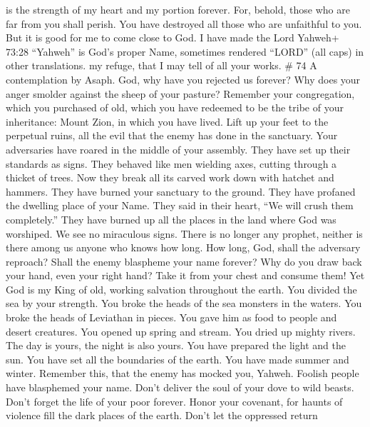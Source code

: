 is the strength of my heart and my portion forever.  For,
behold, those who are far from you shall perish. You have destroyed all
those who are unfaithful to you.  But it is good for me to
come close to God. I have made the Lord Yahweh+ 73:28 ``Yahweh'' is
God's proper Name, sometimes rendered ``LORD'' (all caps) in other
translations. my refuge, that I may tell of all your works. \# 74 A
contemplation by Asaph.  God, why have you rejected us
forever? Why does your anger smolder against the sheep of your pasture?
 Remember your congregation, which you purchased of old,
which you have redeemed to be the tribe of your inheritance: Mount Zion,
in which you have lived.  Lift up your feet to the perpetual
ruins, all the evil that the enemy has done in the sanctuary.
 Your adversaries have roared in the middle of your
assembly. They have set up their standards as signs.  They
behaved like men wielding axes, cutting through a thicket of trees.
 Now they break all its carved work down with hatchet and
hammers.  They have burned your sanctuary to the ground.
They have profaned the dwelling place of your Name.  They
said in their heart, ``We will crush them completely.'' They have burned
up all the places in the land where God was worshiped.  We
see no miraculous signs. There is no longer any prophet, neither is
there among us anyone who knows how long.  How long, God,
shall the adversary reproach? Shall the enemy blaspheme your name
forever?  Why do you draw back your hand, even your right
hand? Take it from your chest and consume them!  Yet God is
my King of old, working salvation throughout the earth. 
You divided the sea by your strength. You broke the heads of the sea
monsters in the waters.  You broke the heads of Leviathan
in pieces. You gave him as food to people and desert creatures.
 You opened up spring and stream. You dried up mighty
rivers.  The day is yours, the night is also yours. You
have prepared the light and the sun.  You have set all the
boundaries of the earth. You have made summer and winter. 
Remember this, that the enemy has mocked you, Yahweh. Foolish people
have blasphemed your name.  Don't deliver the soul of your
dove to wild beasts. Don't forget the life of your poor forever.
 Honor your covenant, for haunts of violence fill the dark
places of the earth.  Don't let the oppressed return
